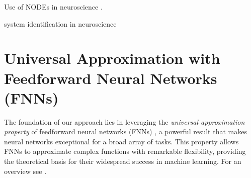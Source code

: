 \documentclass{article}
\theoremstyle{definition} \newtheorem{definition}{Definition}
\theoremstyle{remark} \newtheorem{remark}{Remark}
\newcounter{ct}
\begin{document}
Use of NODEs in neuroscience \citep{kim2021inferring}.

system identification in neuroscience \citep{han2023si} 












\newpage





\newpage
\appendix 

\section{Universal Approximation with Feedforward Neural Networks (FNNs)}\label{sec:uniapproxffn}

The foundation of our approach lies in leveraging the \textit{universal approximation property} of feedforward neural networks (FNNs) \citep{poggio1990networks}, a powerful result that makes neural networks exceptional for a broad array of tasks. This property allows FNNs to approximate complex functions with remarkable flexibility, providing the theoretical basis for their widespread success in machine learning.
For an overview see \citep{blum1991approximation,scarselli1998universal,augustine2024survey}.
\end{document}
